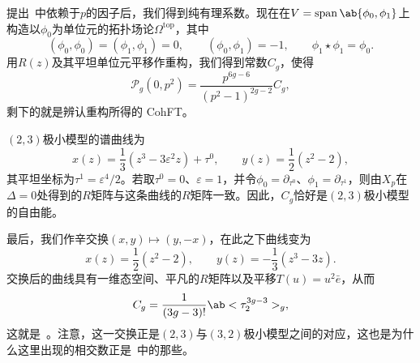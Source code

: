 \documentclass{amsart}
\theoremstyle{definition}
\theoremstyle{remark}
\theoremstyle{plain}
\theoremstyle{definition}
\theoremstyle{remark}
\newcommand{\ep}{\varepsilon}
\newcommand{\mc}[1]{\mathcal{#1}}
\newcommand{\mr}[1]{\mathrm{#1}}
\newcommand{\on}[1]{\operatorname{#1}}
\newcommand{\1}{\mathbf{1}}
\newcommand{\2}{\mathbf{2}}
\newcommand{\3}{\mathbf{3}}
\begin{document}
提出~中依赖于\(p\)的因子后，我们得到纯有理系数。现在在\(V = \on{span}\ab\{\phi_0,\phi_1\}\)上构造以\(\phi_0\)为单位元的拓扑场论\(\Omega^{\mr{top}}\)，其中
\[ (\phi_0,\phi_0) = (\phi_1,\phi_1) = 0, \qquad (\phi_0,\phi_1) = -1, \qquad \phi_1 \star \phi_1 = \phi_0. \]
用\(R(z)\)及其平坦单位元平移作重构，我们得到常数\(C_g\)，使得
\[ \mc{P}_g(0,p^2) = \frac{p^{6g-6}}{(p^2-1)^{2g-2}}C_g, \]
剩下的就是辨认重构所得的 CohFT。

\((2,3)\)极小模型的谱曲线为
\[ x(z) = \frac{1}{3}(z^3-3\ep^2 z) + \tau^0, \qquad y(z) = \frac{1}{2}(z^2-2), \]
其平坦坐标为\(\tau^1 = \ep^4/2\)。若取\(\tau^0 = 0\)、\(\ep = 1\)，并令\(\phi_0 = \partial_{\tau^0}\)、\(\phi_1 = \partial_{\tau^1}\)，则由\(X_p\)在\(\Delta = 0\)处得到的\(R\)矩阵与这条曲线的\(R\)矩阵一致。因此，\(C_g\)恰好是\((2,3)\)极小模型的自由能。

最后，我们作辛交换\((x,y) \mapsto (y,-x)\)，在此之下曲线变为
\[ x(z) = \frac{1}{2}(z^2-2), \qquad y(z) = -\frac{1}{3}(z^3-3z). \]
交换后的曲线具有一维态空间、平凡的\(R\)矩阵以及平移\(T(u) = u^2 \bar{e}\)，从而
\[ C_g = \frac{1}{(3g-3)!}\ab<\tau_2^{3g-3}>_g, \]
这就是~。注意，这一交换正是\((2,3)\)与\((3,2)\)极小模型之间的对应，这也是为什么这里出现的相交数正是~中的那些。


\printbibliography[title={参考文献}]
\end{document}
